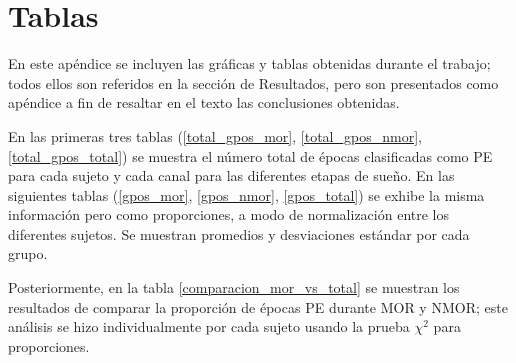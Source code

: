 \documentclass[12pt,a4paper]{mitthesis}
\begin{document}
\appendix

\chapter{Tablas}

En este ap\'endice se incluyen las gr\'aficas y tablas obtenidas durante el trabajo; todos ellos 
son referidos en la secci\'on de Resultados, pero son presentados como ap\'endice a fin de resaltar 
en el texto las conclusiones obtenidas.

En las primeras tres tablas (\ref{total_gpos_mor}, \ref{total_gpos_nmor}, \ref{total_gpos_total}) 
se muestra el n\'umero total de \'epocas clasificadas como PE para cada sujeto y cada canal para 
las diferentes etapas de sue\~no. En las siguientes tablas (\ref{gpos_mor}, \ref{gpos_nmor}, 
\ref{gpos_total}) se exhibe la misma informaci\'on pero como proporciones, a modo de 
normalizaci\'on entre los diferentes sujetos. Se muestran promedios y desviaciones est\'andar por 
cada grupo.

Posteriormente, en la tabla \ref{comparacion_mor_vs_total} se muestran los resultados de comparar 
la proporci\'on de \'epocas PE durante MOR y NMOR; este an\'alisis se hizo individualmente por cada
sujeto usando la prueba $\chi^{2}$ para proporciones.

\end{document}
